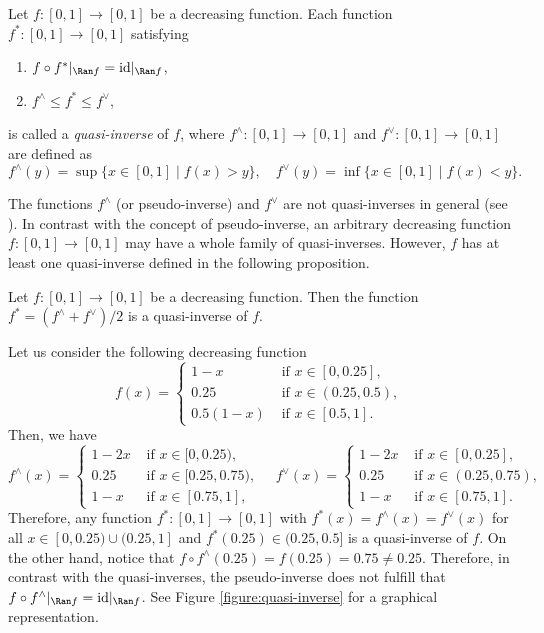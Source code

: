 \begin{definition}\label{def:quasi-inverse} Let $f:[0,1] \to [0,1]$ be a decreasing function. Each function $f^{*}:[0,1]\to[0,1]$ satisfying
	\begin{enumerate}[label=(\roman*)]
		\item $f \circ f^*|_{\Ran f} = \text{id}|_{\Ran f}$,
		\item $f^{\wedge} \leq f^* \leq f^{\vee}$,
	\end{enumerate}
	is called a \emph{quasi-inverse} of $f$, where  $f^{\wedge}:[0,1] \to [0,1]$ and  $f^{\vee}:[0,1]\to[0,1]$ are defined as 
	$$f^{\wedge}(y)=\sup \{x \in [0,1] \mid f(x)>y\}, \quad f^{\vee}(y)=\inf \{x \in [0,1] \mid f(x)<y\}.$$
\end{definition}

The functions $f^{\wedge}$ (or pseudo-inverse) and $f^{\vee}$ are not quasi-inverses in general (see \cite{Klement1999}). In contrast with the concept of pseudo-inverse, an arbitrary decreasing function $f:[0,1] \to [0,1]$ may have a whole family of quasi-inverses. However, $f$ has at least one quasi-inverse defined in the following proposition.

\begin{proposition}\label{prop:quasi-inverse}
	Let $f:[0,1]\to[0,1]$ be a decreasing function. Then the function $f^{*} = (f^{\wedge}+f^{\vee})/2$ is a quasi-inverse of $f$.
\end{proposition}

\begin{example}\label{Ex:Quasi-inverse}
	Let us consider the following decreasing function
	$$f(x) = \left\{\begin{array}{ll}
		1-x & \text{ if } x \in [0,0.25], \\
		0.25 & \text{ if } x \in (0.25,0.5), \\
		0.5(1-x) & \text{ if } x \in [0.5,1]. 
	\end{array}
	\right. 
	$$
	Then, we have
	$$f^{\wedge}(x) = \left\{\begin{array}{ll}
		1-2x & \text{ if } x \in [0,0.25), \\
		0.25 & \text{ if } x \in [0.25,0.75), \\
		1-x & \text{ if } x \in [0.75,1], 
	\end{array}
	\right. \quad
	f^{\vee}(x) = \left\{\begin{array}{ll}
		1-2x & \text{ if } x \in [0,0.25], \\
		0.25 & \text{ if } x \in (0.25,0.75), \\
		1-x & \text{ if } x \in [0.75,1]. 
	\end{array}
	\right. 
	$$
	Therefore, any function $f^*:[0,1] \to [0,1]$ with $f^*(x)=f^{\wedge}(x)=f^{\vee}(x)$ for all $x \in [0,0.25) \cup (0.25,1]$ and $f^*(0.25) \in (0.25,0.5]$ is a quasi-inverse of $f$. On the other hand, notice that $f \circ f^{\wedge}(0.25)=f(0.25)=0.75 \not = 0.25$. Therefore, in contrast with the quasi-inverses, the pseudo-inverse does not fulfill that $f \circ f^{\wedge}|_{\Ran f} = \text{id}|_{\Ran f}$. See Figure \ref{figure:quasi-inverse} for a graphical representation.
\end{example}

